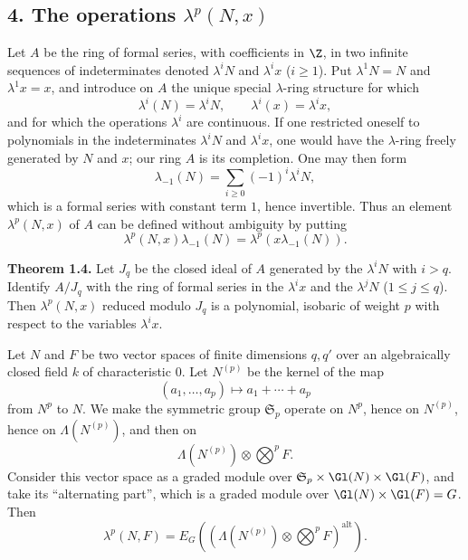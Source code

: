 \subsection*{4. The operations $\lambda^p(N,x)$}

Let $A$ be the ring of formal series, with coefficients in $\Z$, in two infinite sequences of indeterminates denoted $\lambda^iN$ and $\lambda^i x$ ($i\geq 1$). Put $\lambda^1N=N$ and $\lambda^1x=x$, and introduce on $A$ the unique special $\lambda$-ring structure for which
\[
\lambda^i(N)=\lambda^iN,
\qquad
\lambda^i(x)=\lambda^i x,
\]
and for which the operations $\lambda^i$ are continuous. If one restricted oneself to polynomials in the indeterminates $\lambda^iN$ and $\lambda^i x$, one would have the $\lambda$-ring freely generated by $N$ and $x$; our ring $A$ is its completion. One may then form
\begin{equation}\tag{1.31}
\lambda_{-1}(N)=\sum_{i\geq 0}(-1)^i\lambda^iN,
\end{equation}
which is a formal series with constant term $1$, hence invertible. Thus an element $\lambda^p(N,x)$ of $A$ can be defined without ambiguity by putting
\begin{equation}\tag{1.32}
\lambda^p(N,x)\lambda_{-1}(N)=\lambda^p(x\lambda_{-1}(N)).
\end{equation}

\textbf{Theorem 1.4.} Let $J_q$ be the closed ideal of $A$ generated by the $\lambda^iN$ with $i>q$. Identify $A/J_q$ with the ring of formal series in the $\lambda^i x$ and the $\lambda^jN$ ($1\leq j\leq q$). Then $\lambda^p(N,x)$ reduced modulo $J_q$ is a polynomial, isobaric of weight $p$ with respect to the variables $\lambda^i x$.

Let $N$ and $F$ be two vector spaces of finite dimensions $q,q'$ over an algebraically closed field $k$ of characteristic $0$. Let $N^{(p)}$ be the kernel of the map
\[
(a_1,\ldots,a_p)\longmapsto a_1+\cdots+a_p
\]
from $N^p$ to $N$. We make the symmetric group $\mathfrak S_p$ operate on $N^p$, hence on $N^{(p)}$, hence on $\Lambda(N^{(p)})$, and then on
\[
\Lambda(N^{(p)})\otimes\bigotimes^p F.
\]
Consider this vector space as a graded module over $\mathfrak S_p\times\Gl(N)\times\Gl(F)$, and take its ``alternating part'', which is a graded module over $\Gl(N)\times\Gl(F)=G$. Then
\begin{equation}\tag{1.33}
\lambda^p(N,F)=E_G\left(\left(\Lambda(N^{(p)})\otimes\bigotimes^p F\right)^{\mathrm{alt}}\right).
\end{equation}

